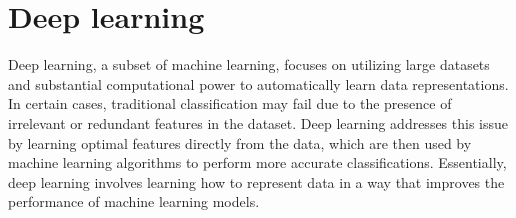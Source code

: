 \section{Deep learning}

Deep learning, a subset of machine learning, focuses on utilizing large datasets and substantial computational power to automatically learn data representations. 
In certain cases, traditional classification may fail due to the presence of irrelevant or redundant features in the dataset. 
Deep learning addresses this issue by learning optimal features directly from the data, which are then used by machine learning algorithms to perform more accurate classifications. 
Essentially, deep learning involves learning how to represent data in a way that improves the performance of machine learning models.